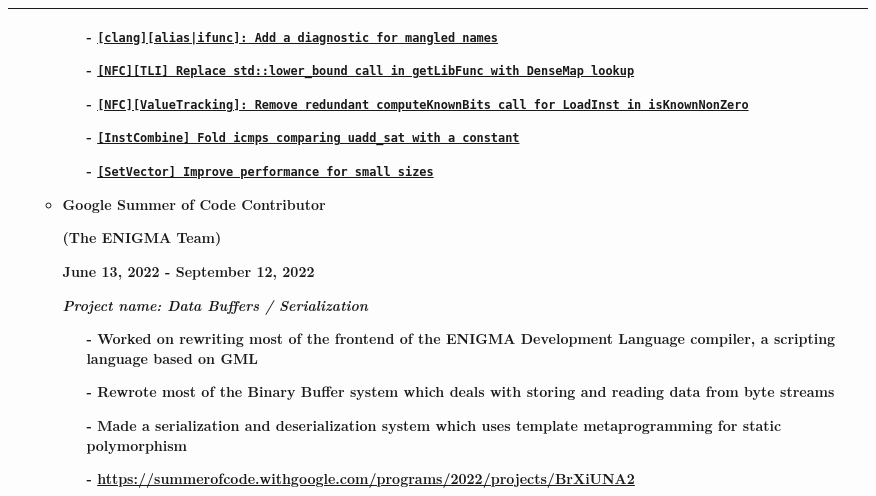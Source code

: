\documentclass[12pt]{article}
\newcommand{\primarycolor}{red}
\begin{document}
\begin{tabularx}{\textwidth}{p{0.4\hsize}|X}
\begin{itemize}[itemsep=1.5ex,leftmargin=1ex]
\begin{itemize}[itemsep=3ex, leftmargin=0.1ex]
                \begin{itemize}[itemsep=1ex, leftmargin=3.5ex]
                    \item[-] \href{https://reviews.llvm.org/D143803}{\texttt{[clang][alias|ifunc]: Add a diagnostic for mangled names}}
                    \vspace{1ex}
                    \item[-] \href{https://reviews.llvm.org/D157951}{\texttt{[NFC][TLI] Replace std::lower\_bound call in getLibFunc with DenseMap lookup}}
                    \vspace{1ex}
                    \item[-] \href{https://reviews.llvm.org/D155958}{\texttt{[NFC][ValueTracking]: Remove redundant computeKnownBits call for LoadInst in isKnownNonZero}}
                    \vspace{1ex}
                    \item[-] \href{https://reviews.llvm.org/D154565}{\texttt{[InstCombine] Fold icmps comparing uadd\_sat with a constant}}
                    \vspace{1ex}
                    \item[-] \href{https://reviews.llvm.org/D152497}{\texttt{[SetVector] Improve performance for small sizes}}
                \end{itemize}

                \item\textbf{Google Summer of Code Contributor}

                \textbf{(The ENIGMA Team)}

                {\color{\primarycolor}June 13, 2022 - September 12, 2022}

                \textit{Project name: Data Buffers / Serialization}

                \begin{itemize}[itemsep=1ex, leftmargin=3.5ex]
                    \item[-] Worked on rewriting most of the frontend of the ENIGMA Development Language compiler, a scripting language based on GML
                    \item[-] Rewrote most of the Binary Buffer system which deals with storing and reading data from byte streams
                    \item[-] Made a serialization and deserialization system which uses template metaprogramming for static polymorphism
                    \item[-] \url{https://summerofcode.withgoogle.com/programs/2022/projects/BrXiUNA2}
                \end{itemize}
            \end{itemize}
        \end{itemize} \\

        \hline
    \end{tabularx}
\end{document}
